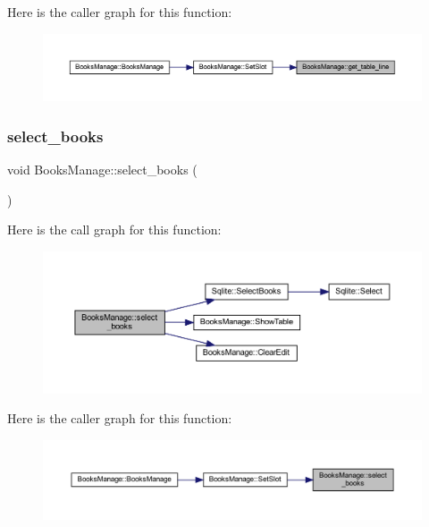 Here is the caller graph for this function\+:
\nopagebreak
\begin{figure}[H]
\begin{center}
\leavevmode
\includegraphics[width=350pt]{class_books_manage_a0269967278f32edfd3f14ccff0a41715_icgraph}
\end{center}
\end{figure}
\mbox{\label{class_books_manage_ab2a76473efc3b68a9e1589cca6ab615d}} 
\subsubsection{\texorpdfstring{select\_books}{select\_books}}
{\footnotesize\ttfamily void Books\+Manage\+::select\+\_\+books (\begin{DoxyParamCaption}{ }\end{DoxyParamCaption})\hspace{0.3cm}{\ttfamily [slot]}}

Here is the call graph for this function\+:
\nopagebreak
\begin{figure}[H]
\begin{center}
\leavevmode
\includegraphics[width=350pt]{class_books_manage_ab2a76473efc3b68a9e1589cca6ab615d_cgraph}
\end{center}
\end{figure}
Here is the caller graph for this function\+:
\nopagebreak
\begin{figure}[H]
\begin{center}
\leavevmode
\includegraphics[width=350pt]{class_books_manage_ab2a76473efc3b68a9e1589cca6ab615d_icgraph}
\end{center}
\end{figure}
\mbox{\label{class_books_manage_a009c231a6f8976be927b7acfdc4d4591}} 
